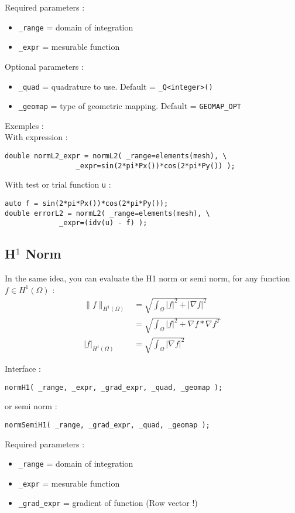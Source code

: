 \noindent Required parameters :
\begin{itemize}
 \item \lstinline!_range! = domain of integration
 \item \lstinline!_expr! = mesurable function
\end{itemize}

\noindent Optional parameters :
\begin{itemize}
 \item \lstinline!_quad! = quadrature to use. Default = \lstinline!_Q<integer>()!
 \item \lstinline!_geomap! = type of geometric mapping. Default = \lstinline!GEOMAP_OPT!
\end{itemize}

\noindent Exemples :\\
With expression :
\begin{lstlisting}
double normL2_expr = normL2( _range=elements(mesh), \
			     _expr=sin(2*pi*Px())*cos(2*pi*Py()) );
\end{lstlisting}
With test or trial function \lstinline!u! :
\begin{lstlisting}
auto f = sin(2*pi*Px())*cos(2*pi*Py());
double errorL2 = normL2( _range=elements(mesh), \
			 _expr=(idv(u) - f) );
\end{lstlisting}


\subsection{H$^1$ Norm}
In the same idea, you can evaluate the H1 norm or semi norm, for any function $f \in H^1(\Omega)$ :
\begin{align*}
 \parallel f \parallel_{H^1(\Omega)}&=\sqrt{\int_\Omega |f|^2+|\nabla f|^2}\\
&=\sqrt{\int_\Omega |f|^2+\nabla f*\nabla f^T}\\
|f|_{H^1(\Omega)}&=\sqrt{\int_\Omega |\nabla f|^2}
\end{align*}

\label{keywords:normH1}
\noindent Interface :
\begin{lstlisting}
normH1( _range, _expr, _grad_expr, _quad, _geomap );
\end{lstlisting}
or semi norm :
\begin{lstlisting}
normSemiH1( _range, _grad_expr, _quad, _geomap );
\end{lstlisting}

\noindent Required parameters :
\begin{itemize}
 \item \lstinline!_range! = domain of integration
 \item \lstinline!_expr! = mesurable function
 \item \lstinline!_grad_expr! = gradient of function (Row vector !)
\end{itemize}


